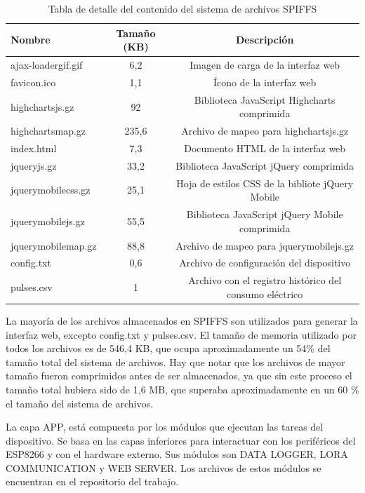\begin{table}[h]
	\centering
	\caption[Contenido SPIFFS]{Tabla de detalle del contenido del sistema de archivos SPIFFS}
	\begin{tabular}{l c c}    
		\toprule
		\textbf{Nombre} & \textbf{Tamaño (KB)} & \textbf{Descripción} \\
		\midrule
		ajax-loadergif.gif & 6,2 & Imagen de carga de la interfaz web \\
		favicon.ico & 1,1 & Ícono de la interfaz web\\
		highchartsjs.gz	& 92 & Biblioteca JavaScript Highcharts comprimida \\
		highchartsmap.gz & 235,6 & Archivo de mapeo para highchartsjs.gz \\
		index.html & 7,3 & Documento HTML de la interfaz web \\
		jqueryjs.gz & 33,2 & Biblioteca JavaScript jQuery comprimida \\
		jquerymobilecss.gz & 25,1 & Hoja de estilos CSS de la bibliote jQuery Mobile \\
		jquerymobilejs.gz & 55,5 & Biblioteca JavaScript jQuery Mobile comprimida \\
		jquerymobilemap.gz & 88,8 & Archivo de mapeo para jquerymobilejs.gz \\
		config.txt & 0,6 & Archivo de configuración del dispositivo \\
		pulses.csv & 1 & Archivo con el registro histórico del consumo eléctrico \\
		
		\bottomrule
		\hline
	\end{tabular}
	\label{tab:spiffsDetail}
\end{table}

La mayoría de los archivos almacenados en SPIFFS son utilizados para generar la interfaz web, excepto config.txt y pulses.csv. El tamaño de memoria utilizado por todos los archivos es de 546,4 KB, que ocupa aproximadamente un 54\% del tamaño total del sistema de archivos. Hay que notar que los archivos de mayor tamaño fueron comprimidos antes de ser almacenados, ya que sin este proceso el tamaño total hubiera sido de 1,6 MB, que superaba aproximadamente en un 60 \% el tamaño del sistema de archivos.

La capa APP, está compuesta por los módulos que ejecutan las tareas del dispositivo. Se basa en las capas inferiores para interactuar con los periféricos del ESP8266 y con el hardware externo. Sus módulos son DATA LOGGER, LORA COMMUNICATION y WEB SERVER. Los archivos de estos módulos se encuentran en el repositorio del trabajo.

